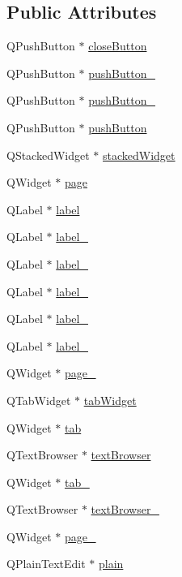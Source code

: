 \subsection*{Public Attributes}
\begin{DoxyCompactItemize}
\item 
QPushButton $\ast$ \hyperlink{classUi__about_a7c764d7b424b82cda32db2aa1067fba4}{closeButton}
\item 
QPushButton $\ast$ \hyperlink{classUi__about_abeef62c6750cebb3c0f0912ae74409a5}{pushButton\_}
\item 
QPushButton $\ast$ \hyperlink{classUi__about_a9dedeaa7b70ac20bcd4912ddcdf0ec64}{pushButton\_}
\item 
QPushButton $\ast$ \hyperlink{classUi__about_a8880d015410b512f4e5768d161b24fb9}{pushButton}
\item 
QStackedWidget $\ast$ \hyperlink{classUi__about_ae47ab43139893b6e08dba3cb781dcd4f}{stackedWidget}
\item 
QWidget $\ast$ \hyperlink{classUi__about_acdbd820c02029d71cfc119a9832fef24}{page}
\item 
QLabel $\ast$ \hyperlink{classUi__about_a30c2d2ae8206508b81d75f45349bd8fc}{label}
\item 
QLabel $\ast$ \hyperlink{classUi__about_ae19cfd158b2f8da605548ed66ca3e370}{label\_}
\item 
QLabel $\ast$ \hyperlink{classUi__about_aaea79e09f696d357043c9bb49f8ca467}{label\_}
\item 
QLabel $\ast$ \hyperlink{classUi__about_a8387738d5bdde604124f3f117f367e74}{label\_}
\item 
QLabel $\ast$ \hyperlink{classUi__about_aef1b6ef4e3a01966c0e1036b3aa7f23f}{label\_}
\item 
QLabel $\ast$ \hyperlink{classUi__about_aa459ebfad1e0a2648d20c60d4c6fc115}{label\_}
\item 
QWidget $\ast$ \hyperlink{classUi__about_ae8fa17161b240480e903aea6b9ada290}{page\_}
\item 
QTabWidget $\ast$ \hyperlink{classUi__about_a3d168e9475d87a9889fa7cb50a9de5a8}{tabWidget}
\item 
QWidget $\ast$ \hyperlink{classUi__about_a1849ee3563ac7a6e33685e5a8e3ef77a}{tab}
\item 
QTextBrowser $\ast$ \hyperlink{classUi__about_a9af2caf77c8d2dd709c0e7a893d8ae60}{textBrowser}
\item 
QWidget $\ast$ \hyperlink{classUi__about_adb6da8ff2f93532372eef3704898e677}{tab\_}
\item 
QTextBrowser $\ast$ \hyperlink{classUi__about_a5105430ce15bd81a1a93d192f3ff0428}{textBrowser\_}
\item 
QWidget $\ast$ \hyperlink{classUi__about_ab53caedb09cc7a40a6ebd02032006b81}{page\_}
\item 
QPlainTextEdit $\ast$ \hyperlink{classUi__about_a0469ccb1dc32f0b8e757e59148ae3467}{plain}
\end{DoxyCompactItemize}


